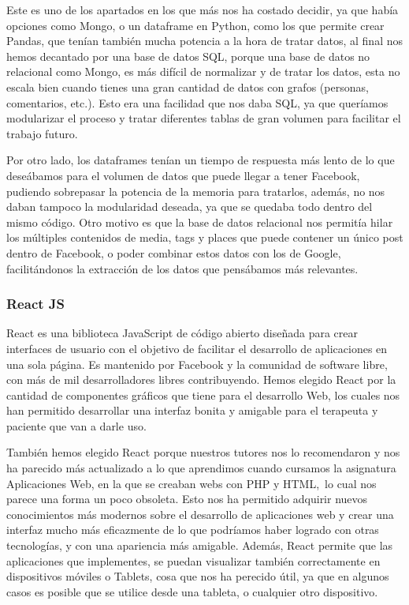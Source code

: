 		Este es uno de los apartados en los que más nos ha costado decidir, ya que había opciones como Mongo, o un dataframe en Python, como los que permite crear Pandas, que tenían también mucha potencia a la hora de tratar datos, al final nos hemos decantado por una base de datos SQL, porque una base de datos no relacional como Mongo, es más difícil de normalizar y de tratar los datos, esta no escala bien cuando tienes una gran cantidad de datos con grafos (personas, comentarios, etc.). Esto era una facilidad que nos daba SQL, ya que queríamos modularizar el proceso y tratar diferentes tablas de gran volumen para facilitar el trabajo futuro. 
		
		Por otro lado, los dataframes tenían un tiempo de respuesta más lento de lo que deseábamos para el volumen de datos que puede llegar a tener Facebook, pudiendo sobrepasar la potencia de la memoria para tratarlos, además, no nos daban tampoco la modularidad deseada, ya que se quedaba todo dentro del mismo código. Otro motivo es que la base de datos relacional nos permitía hilar los múltiples contenidos de media, tags y places que puede contener un único post dentro de Facebook, o poder combinar estos datos con los de Google, facilitándonos la extracción de los datos que pensábamos más relevantes.
		
	\subsubsection*{React JS}
	 	React es una biblioteca JavaScript de código abierto diseñada para crear interfaces de usuario con el objetivo de facilitar el desarrollo de aplicaciones en una sola página. Es mantenido por Facebook y la comunidad de software libre, con más de mil desarrolladores libres contribuyendo. Hemos elegido React por la cantidad de componentes gráficos que tiene para el desarrollo Web, los cuales nos han permitido desarrollar una interfaz bonita y amigable para el terapeuta y paciente que van a darle uso.
	 	
	 	También hemos elegido React porque nuestros tutores nos lo recomendaron y nos ha parecido más actualizado a lo que aprendimos cuando cursamos la asignatura Aplicaciones Web, en la que se creaban webs con PHP y HTML, lo cual nos parece una forma un poco obsoleta. Esto nos ha permitido adquirir nuevos conocimientos más modernos sobre el desarrollo de aplicaciones web y crear una interfaz mucho más eficazmente de lo que podríamos haber logrado con otras tecnologías, y con una apariencia más amigable. Además, React permite que las aplicaciones que implementes, se puedan visualizar también correctamente en dispositivos móviles o Tablets, cosa que nos ha perecido útil, ya que en algunos casos es posible que se utilice desde una tableta, o cualquier otro dispositivo.
	 	
